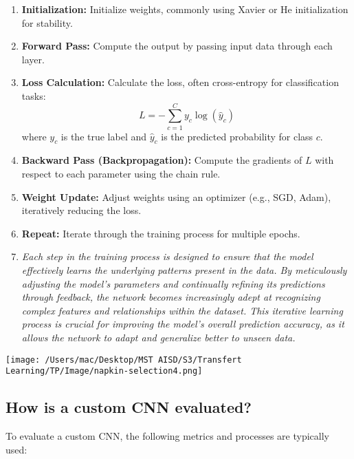 \documentclass{article}
\begin{document}
\begin{enumerate}
    \item \textbf{Initialization:} Initialize weights, commonly using Xavier or He initialization for stability.
    \item \textbf{Forward Pass:} Compute the output by passing input data through each layer.
    \item \textbf{Loss Calculation:} Calculate the loss, often cross-entropy for classification tasks:
    \[
    L = - \sum_{c=1}^C y_c \log(\hat{y}_c)
    \]
    where \( y_c \) is the true label and \( \hat{y}_c \) is the predicted probability for class \( c \).
    \item \textbf{Backward Pass (Backpropagation):} Compute the gradients of \( L \) with respect to each parameter using the chain rule.
    \item \textbf{Weight Update:} Adjust weights using an optimizer (e.g., SGD, Adam), iteratively reducing the loss.
    \item \textbf{Repeat:} Iterate through the training process for multiple epochs.
    \item \textit{Each step in the training process is designed to ensure that the model effectively learns the underlying patterns present in the data. By meticulously adjusting the model's parameters and continually refining its predictions through feedback, the network becomes increasingly adept at recognizing complex features and relationships within the dataset. This iterative learning process is crucial for improving the model's overall prediction accuracy, as it allows the network to adapt and generalize better to unseen data.}
\end{enumerate}




\texttt{[image: /Users/mac/Desktop/MST AISD/S3/Transfert Learning/TP/Image/napkin-selection4.png]}

\subsection{How is a custom CNN evaluated?}

To evaluate a custom CNN, the following metrics and processes are typically used:
\end{document}
